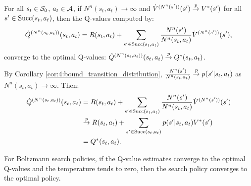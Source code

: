     \begin{lemma}
        \label{lem:q_converge}
        For all $s_t\in\mathcal{S}_0$, $a_t\in\mathcal{A}$, if $N^n(s_t,a_t)\rightarrow\infty$ and $\dot{V}^{(N^n(s'))}(s')\overset{p}{\to} V^*(s')$ for all $s'\in{\textnormal{Succ}(s_t,a_t)}$, then the Q-values computed by:
        \begin{align}
            \dot{Q}^{(N^n(s_t,a_t))}(s_t,a_t) = R(s_t,a_t) + \sum_{s' \in {\textnormal{Succ}(s_t,a_t)}} 
                \frac{N^n(s')}{N^n(s_t,a_t)} \dot{V}^{(N^n(s'))}(s'),
        \end{align}
        converge to the optimal Q-values: $\dot{Q}^{(N^n(s_t,a_t))}(s_t,a_t) \overset{p}{\to} Q^*(s_t,a_t)$.
    \end{lemma}
    \begin{proofoutline}
        By Corollary \ref{cor:4:bound_transition_distribution}, 
        $\frac{N^n(s')}{N^n(s_t,a_t)} \overset{p}{\to} p(s'|s_t,a_t)$ as $N^n(s_t,a_t)\rightarrow\infty$.
        Then:
        \begin{align}
            \dot{Q}^{(N^n(s_t,a_t))}(s_t,a_t) 
                &= R(s_t,a_t) + \sum_{s' \in {\textnormal{Succ}(s_t,a_t)}} 
                    \frac{N^n(s')}{N^n(s_t,a_t)} \dot{V}^{(N^n(s'))}(s') \\
                &\overset{p}{\to} R(s_t,a_t) + \sum_{s' \in {\textnormal{Succ}(s_t,a_t)}} 
                    p(s'|s_t,a_t) V^*(s') \\
                &= Q^*(s_t,a_t).
        \end{align}
    \end{proofoutline}

    \proofsep



    

    For Boltzmann search policies, if the Q-value estimates converge to the optimal Q-values and the temperature tends to zero, then the search policy converges to the optimal policy.

